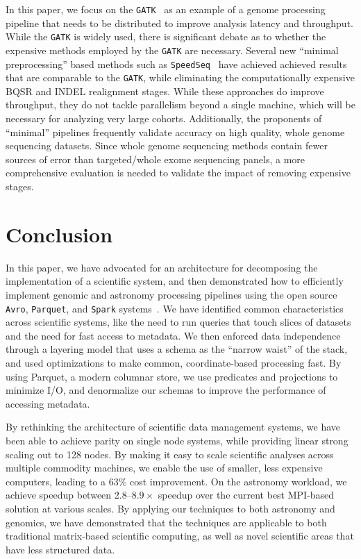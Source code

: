 \documentclass{acm_proc_article-sp}
\begin{document}
In this paper, we focus on the \texttt{GATK}~\cite{depristo11} as an example of a genome processing pipeline that
needs to be distributed to improve analysis latency and throughput. While the \texttt{GATK} is widely used,
there is significant debate as to whether the expensive methods employed by the \texttt{GATK} are necessary. Several
new ``minimal preprocessing'' based methods such as \texttt{SpeedSeq}~\cite{chiang14} have achieved achieved
results that are comparable to the \texttt{GATK}, while eliminating the computationally expensive BQSR and INDEL
realignment stages. While these approaches do improve throughput, they do not tackle parallelism beyond a single
machine, which will be necessary for analyzing very large cohorts. Additionally, the proponents of ``minimal'' pipelines
frequently validate accuracy on high quality, whole genome sequencing datasets. Since whole genome sequencing
methods contain fewer sources of error than targeted/whole exome sequencing panels, a more comprehensive
evaluation is needed to validate the impact of removing expensive stages.

\section{Conclusion}
\label{sec:conclusion}

In this paper, we have advocated for an architecture for decomposing the implementation of a scientific system, and
then demonstrated how to efficiently implement genomic and astronomy processing pipelines using the open source
\texttt{Avro}, \texttt{Parquet}, and \texttt{Spark} systems~\cite{avro, parquet, zaharia10}. We have identified common
characteristics across scientific systems, like the need to run queries that touch slices of datasets and the need
for fast access to metadata. We then enforced data independence through a layering model that uses a schema
as the ``narrow waist'' of the stack, and used optimizations to make common, coordinate-based processing
fast. By using Parquet, a modern columnar store, we use predicates and projections to minimize I/O, and
denormalize our schemas to improve the performance of accessing metadata.

By rethinking the architecture of scientific data management systems, we have been able to achieve parity on single
node systems, while providing linear strong scaling out to 128 nodes. By making it easy to scale scientific analyses
across multiple commodity machines, we enable the use of smaller, less expensive computers, leading to a 63\% cost
improvement. On the astronomy workload, we achieve speedup between 2.8--$8.9\times$ speedup over the current
best MPI-based solution at various scales. By applying our techniques to both astronomy and genomics, we have
demonstrated that the techniques are applicable to both traditional matrix-based scientific computing, as well as novel
scientific areas that have less structured data.
\end{document}
